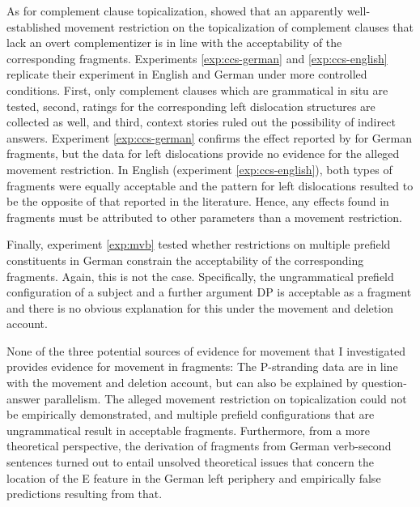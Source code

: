 As for complement clause topicalization, \citet{merchant.etal2013} showed that an apparently well-established movement restriction on the topicalization of complement clauses that lack an overt complementizer is in line with the acceptability of the corresponding fragments. Experiments \ref{exp:ccs-german} and \ref{exp:ccs-english} replicate their experiment in English and German under more controlled conditions. First, only complement clauses which are grammatical in situ are tested, second, ratings for the corresponding left dislocation structures are collected as well, and third, context stories ruled out the possibility of indirect answers. Experiment \ref{exp:ccs-german} confirms the effect reported by \citet{merchant.etal2013} for German fragments, but the data for left dislocations provide no evidence for the alleged movement restriction. In English (experiment \ref{exp:ccs-english}), both types of fragments were equally acceptable and the pattern for left dislocations resulted to be the opposite of that reported in the literature. Hence, any effects found in fragments must be attributed to other parameters than a movement restriction.

Finally, experiment \ref{exp:mvb} tested whether restrictions on multiple prefield constituents in German constrain the acceptability of the corresponding fragments. Again, this is not the case. Specifically, the ungrammatical prefield configuration of a subject and a further argument DP is acceptable as a fragment and there is no obvious explanation for this under the movement and deletion account.

None of the three potential sources of evidence for movement that I investigated provides evidence for movement in fragments: The P-stranding data are in line with the movement and deletion account, but can also be explained by question-answer parallelism. The alleged movement restriction on topicalization could not be empirically demonstrated, and multiple prefield configurations that are ungrammatical result in acceptable fragments. Furthermore, from a more theoretical perspective, the derivation of fragments from German verb-second sentences turned out to entail unsolved theoretical issues that concern the location of the E feature in the German left periphery and empirically false predictions resulting from that.

